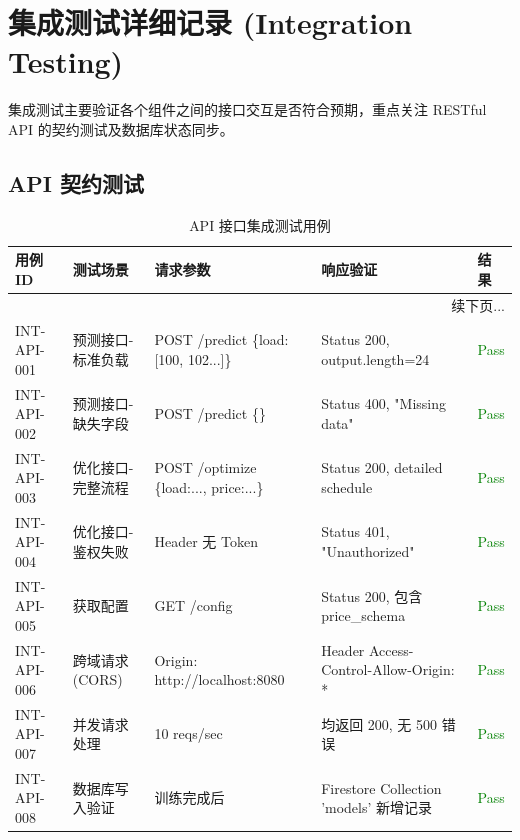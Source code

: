 \section{集成测试详细记录 (Integration Testing)}

集成测试主要验证各个组件之间的接口交互是否符合预期，重点关注 RESTful API 的契约测试及数据库状态同步。

\subsection{API 契约测试}

\begin{longtable}{|p{2.5cm}|p{4cm}|p{4cm}|p{3.5cm}|p{1.5cm}|}
    \caption{API 接口集成测试用例}                                                                                                                    \\
    \hline
    \textbf{用例 ID} & \textbf{测试场景} & \textbf{请求参数}                          & \textbf{响应验证}                         & \textbf{结果}             \\ \hline
    \endfirsthead
    \hline
    \multicolumn{5}{|r|}{续下页...}                                                                                                              \\ \hline
    \endfoot
    \hline
    \endlastfoot

    INT-API-001    & 预测接口-标准负载     & POST /predict \{load: [100, 102...]\}  & Status 200, output.length=24          & \textcolor{green}{Pass} \\ \hline
    INT-API-002    & 预测接口-缺失字段     & POST /predict \{\}                     & Status 400, "Missing data"            & \textcolor{green}{Pass} \\ \hline
    INT-API-003    & 优化接口-完整流程     & POST /optimize \{load:..., price:...\} & Status 200, detailed schedule         & \textcolor{green}{Pass} \\ \hline
    INT-API-004    & 优化接口-鉴权失败     & Header 无 Token                         & Status 401, "Unauthorized"            & \textcolor{green}{Pass} \\ \hline
    INT-API-005    & 获取配置          & GET /config                            & Status 200, 包含 price\_schema          & \textcolor{green}{Pass} \\ \hline
    INT-API-006    & 跨域请求 (CORS)   & Origin: http://localhost:8080          & Header Access-Control-Allow-Origin: * & \textcolor{green}{Pass} \\ \hline
    INT-API-007    & 并发请求处理        & 10 reqs/sec                            & 均返回 200, 无 500 错误                     & \textcolor{green}{Pass} \\ \hline
    INT-API-008    & 数据库写入验证       & 训练完成后                                  & Firestore Collection 'models' 新增记录    & \textcolor{green}{Pass} \\ \hline
\end{longtable}

